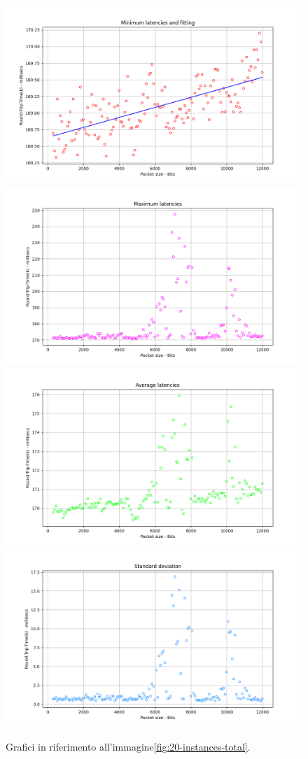 \begin{figure}[h]
    \centering
    \includegraphics[width = .49\textwidth]{hw-2/report/imgs/20-instances/la-min-latencies.png}
    \includegraphics[width = .49\textwidth]{hw-2/report/imgs/20-instances/la-max-latencies.png}
    \includegraphics[width = .49\textwidth]{hw-2/report/imgs/20-instances/la-avg-latencies.png}
    \includegraphics[width = .49\textwidth]{hw-2/report/imgs/20-instances/la-standard-deviation.png}
    \caption{Grafici in riferimento all'immagine\ref{fig:20-instances-total}.}
    \label{fig:20-instances-stats}
\end{figure}

